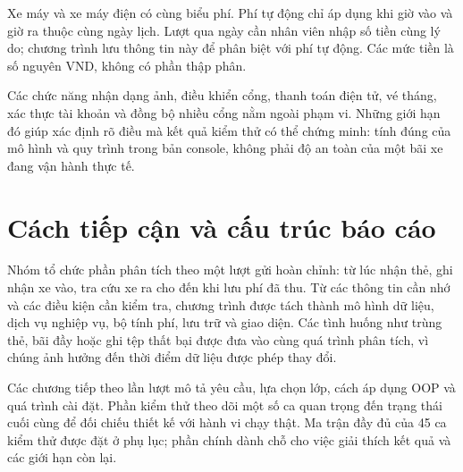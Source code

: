Xe máy và xe máy điện có cùng biểu phí. Phí tự động chỉ áp dụng khi giờ vào và giờ ra thuộc cùng ngày lịch. Lượt qua ngày cần nhân viên nhập số tiền cùng lý do; chương trình lưu thông tin này để phân biệt với phí tự động. Các mức tiền là số nguyên VND, không có phần thập phân.

Các chức năng nhận dạng ảnh, điều khiển cổng, thanh toán điện tử, vé tháng, xác thực tài khoản và đồng bộ nhiều cổng nằm ngoài phạm vi. Những giới hạn đó giúp xác định rõ điều mà kết quả kiểm thử có thể chứng minh: tính đúng của mô hình và quy trình trong bản console, không phải độ an toàn của một bãi xe đang vận hành thực tế.

\section{Cách tiếp cận và cấu trúc báo cáo}
Nhóm tổ chức phần phân tích theo một lượt gửi hoàn chỉnh: từ lúc nhận thẻ, ghi nhận xe vào, tra cứu xe ra cho đến khi lưu phí đã thu. Từ các thông tin cần nhớ và các điều kiện cần kiểm tra, chương trình được tách thành mô hình dữ liệu, dịch vụ nghiệp vụ, bộ tính phí, lưu trữ và giao diện. Các tình huống như trùng thẻ, bãi đầy hoặc ghi tệp thất bại được đưa vào cùng quá trình phân tích, vì chúng ảnh hưởng đến thời điểm dữ liệu được phép thay đổi.

Các chương tiếp theo lần lượt mô tả yêu cầu, lựa chọn lớp, cách áp dụng OOP và quá trình cài đặt. Phần kiểm thử theo dõi một số ca quan trọng đến trạng thái cuối cùng để đối chiếu thiết kế với hành vi chạy thật. Ma trận đầy đủ của 45 ca kiểm thử được đặt ở phụ lục; phần chính dành chỗ cho việc giải thích kết quả và các giới hạn còn lại.
